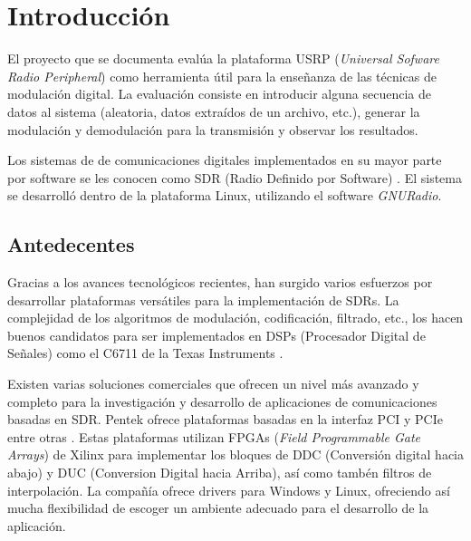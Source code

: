 \chapter{Introducci\'on}

El proyecto que se documenta eval\'ua la plataforma USRP (\emph{Universal Sofware Radio Peripheral}) como herramienta \'util
para la ense\~nanza de las t\'ecnicas de modulaci\'on digital. La evaluaci\'on consiste en introducir alguna secuencia de
datos al sistema (aleatoria, datos extra\'idos de un archivo, etc.), generar la modulaci\'on y demodulaci\'on para la
transmisi\'on y observar los resultados.

Los sistemas de de comunicaciones digitales implementados en su  mayor parte por software se les conocen como SDR (Radio
Definido por Software) \cite{mitola}. El sistema se desarroll\'o dentro de la plataforma Linux, utilizando el software
\emph{GNURadio}.

\section{Antedecentes}

Gracias a los avances tecnol\'ogicos recientes, han surgido varios esfuerzos por desarrollar plataformas vers\'atiles para
la implementaci\'on de SDRs. La complejidad de los algoritmos de modulaci\'on, codificaci\'on, filtrado, etc., los hacen buenos
candidatos para ser implementados en DSPs (Procesador Digital de Se\~nales) como el C6711 de la Texas Instruments
\cite{abendroth}.

Existen varias soluciones comerciales que ofrecen un nivel m\'as avanzado y completo para la investigaci\'on y desarrollo de
aplicaciones de comunicaciones basadas en SDR. Pentek ofrece plataformas basadas en la interfaz PCI y PCIe entre otras
\cite{pentek}. Estas plataformas utilizan FPGAs (\emph{Field Programmable Gate Arrays}) de Xilinx para implementar los
bloques de DDC (Conversi\'on digital hacia abajo) y DUC (Conversion Digital hacia Arriba), as\'i como tamb\'en filtros de
interpolaci\'on. La compa\~n\'ia ofrece drivers para Windows y Linux, ofreciendo as\'i mucha flexibilidad de escoger un
ambiente adecuado para el desarrollo de la aplicaci\'on.


